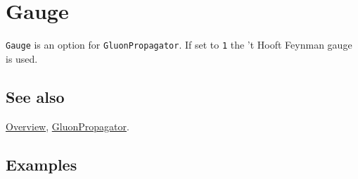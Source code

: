 \documentclass[../FeynCalcManual.tex]{subfiles}
\begin{document}
\hypertarget{gauge}{
\section{Gauge}\label{gauge}}

\texttt{Gauge} is an option for \texttt{GluonPropagator}. If set to
\texttt{1} the 't Hooft Feynman gauge is used.

\subsection{See also}

\hyperlink{toc}{Overview}, \hyperlink{gluonpropagator}{GluonPropagator}.

\subsection{Examples}
\end{document}
